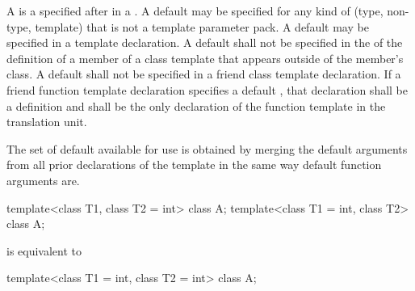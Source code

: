 \pnum
A
is a
 specified after
\tcode{=}
in a
.
A default
may be specified for any kind of
(type, non-type, template)
that is not a template parameter pack.
A default
may be specified in a template declaration.
A default
shall not be specified in the
of the definition of a member of a class template that appears outside
of the member's class.
A default
shall not be specified in a friend class template declaration.
If a friend function template declaration
specifies a default
,
that declaration shall be a definition and shall be the only declaration of
the function template in the translation unit.

\pnum
The set of default
available for use is obtained by merging the default arguments
from all prior declarations of the template in the
same way default function arguments are.
\begin{example}

\begin{codeblock}
template<class T1, class T2 = int> class A;
template<class T1 = int, class T2> class A;
\end{codeblock}

is equivalent to

\begin{codeblock}
template<class T1 = int, class T2 = int> class A;
\end{codeblock}
\end{example}

